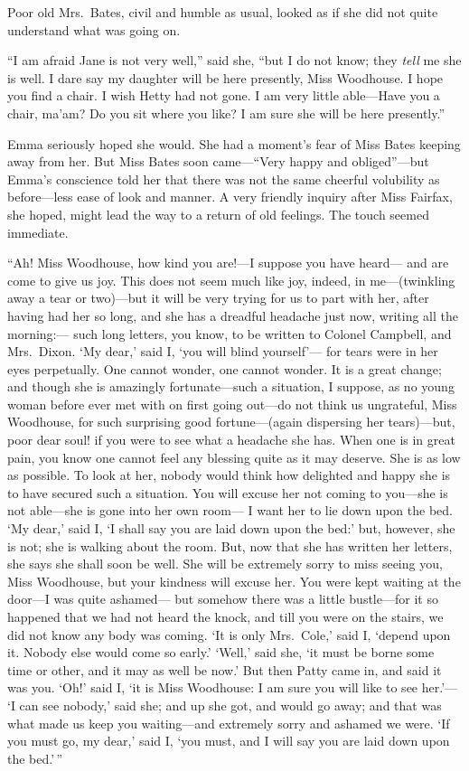 Poor old Mrs.\ Bates, civil and humble as usual, looked as if she
did not quite understand what was going on.

``I am afraid Jane is not very well,'' said she, ``but I do not know;
they \emph{tell} me she is well.  I dare say my daughter will be here presently,
Miss Woodhouse.  I hope you find a chair.  I wish Hetty had not gone.
I am very little able---Have you a chair, ma'am? Do you sit where
you like?  I am sure she will be here presently.''

Emma seriously hoped she would.  She had a moment's fear of Miss
Bates keeping away from her.  But Miss Bates soon came---``Very happy
and obliged''---but Emma's conscience told her that there was not the
same cheerful volubility as before---less ease of look and manner.
A very friendly inquiry after Miss Fairfax, she hoped, might lead
the way to a return of old feelings.  The touch seemed immediate.

``Ah!  Miss Woodhouse, how kind you are!---I suppose you have heard---%
and are come to give us joy.  This does not seem much like joy,
indeed, in me---(twinkling away a tear or two)---but it will be
very trying for us to part with her, after having had her so long,
and she has a dreadful headache just now, writing all the morning:---%
such long letters, you know, to be written to Colonel Campbell,
and Mrs.\ Dixon.  `My dear,' said I, `you will blind yourself'---%
for tears were in her eyes perpetually.  One cannot wonder,
one cannot wonder.  It is a great change; and though she is
amazingly fortunate---such a situation, I suppose, as no young woman
before ever met with on first going out---do not think us ungrateful,
Miss Woodhouse, for such surprising good fortune---(again dispersing
her tears)---but, poor dear soul! if you were to see what a headache
she has.  When one is in great pain, you know one cannot feel
any blessing quite as it may deserve.  She is as low as possible.
To look at her, nobody would think how delighted and happy she
is to have secured such a situation.  You will excuse her not
coming to you---she is not able---she is gone into her own room---%
I want her to lie down upon the bed.  `My dear,' said I, `I shall
say you are laid down upon the bed:'  but, however, she is not;
she is walking about the room.  But, now that she has written
her letters, she says she shall soon be well.  She will be extremely
sorry to miss seeing you, Miss Woodhouse, but your kindness will
excuse her.  You were kept waiting at the door---I was quite ashamed---%
but somehow there was a little bustle---for it so happened that we
had not heard the knock, and till you were on the stairs, we did
not know any body was coming.  `It is only Mrs.\ Cole,' said I,
`depend upon it.  Nobody else would come so early.'  `Well,' said she,
`it must be borne some time or other, and it may as well be now.'
But then Patty came in, and said it was you.  `Oh!' said I,
`it is Miss Woodhouse:  I am sure you will like to see her.'---%
`I can see nobody,' said she; and up she got, and would go away;
and that was what made us keep you waiting---and extremely sorry
and ashamed we were.  `If you must go, my dear,' said I, `you must,
and I will say you are laid down upon the bed.'\,''

